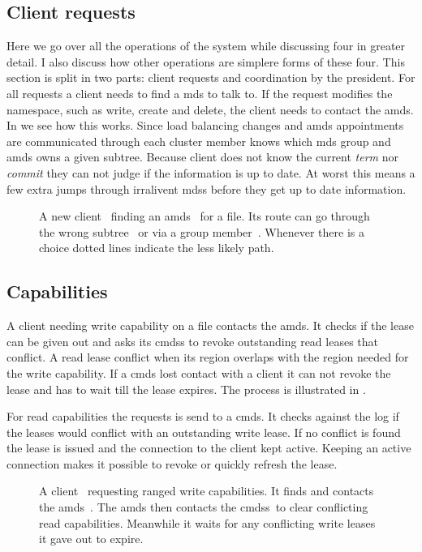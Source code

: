 \subsection{Client requests} %
Here we go over all the operations of the system while discussing four in greater detail. I also discuss how other operations are simplere forms of these four. This section is split in two parts: client requests and coordination by the president.
%
For all requests a client needs to find a \ac{mds} to talk to. If the request modifies the namespace, such as write, create and delete, the client needs to contact the \ac{amds}. In  we see how this works. Since load balancing changes and \ac{amds} appointments are communicated through \raft{} each cluster member knows which \ac{mds} group and \ac{amds} owns a given subtree. Because client does not know the current \raft{} \textit{term} nor \textit{commit} they can not judge if the information is up to date. At worst this means a few extra jumps through irralivent \acp{mds} before they get up to date information.
%
\begin{figure}[htbp]
	\centering
	
	\caption{A new client~\clientLeg{} finding an \ac{amds}~\amdsLeg{} for a file. Its route can go through the wrong subtree~\umdsLeg{} or via a group member~\cmdsLeg{}. Whenever there is a choice dotted lines indicate the less likely path.}
	\label{fig:find_aMDS}
\end{figure}
%
\subsection*{Capabilities} 
A client needing write capability on a file contacts the \ac{amds}. It checks if the lease can be given out and asks its \acp{cmds} to revoke outstanding read leases that conflict. A read lease conflict when its region overlaps with the region needed for the write capability. If a \ac{cmds} lost contact with a client it can not revoke the lease and has to wait till the lease expires. The process is illustrated in . 

For read capabilities the requests is send to a \ac{cmds}. It checks against the \raft{} log if the leases would conflict with an outstanding write lease. If no conflict is found the lease is issued and the connection to the client kept active. Keeping an active connection makes it possible to revoke or quickly refresh the lease.
%
\begin{figure}[htbp]
	\centering
	
	\caption{A client~\clientLeg{} requesting ranged write capabilities. It finds and contacts the \ac{amds}~\amdsLeg{}. The \ac{amds} then contacts the \acp{cmds}~\cmdsLeg to clear conflicting read capabilities. Meanwhile it waits for any conflicting write leases it gave out to expire.}
	\label{fig:write}
\end{figure}
%
